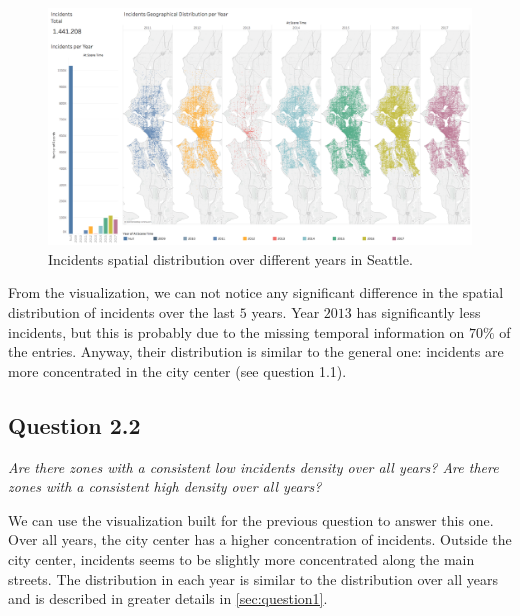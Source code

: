 \begin{figure}[h]
	\centering
	\includegraphics[width=\columnwidth]{figures/2_1_geographical_temporal_distribution}
	\caption{Incidents spatial distribution over different years in Seattle.}
	\label{fig:2_1_geographical_temporal_distribution}
\end{figure}

From the visualization, we can not notice any significant difference in the spatial distribution of incidents over the last $5$ years.
Year $2013$ has significantly less incidents, but this is probably due to the missing temporal information on $70\%$ of the entries.
Anyway, their distribution is similar to the general one: incidents are more concentrated in the city center (see question 1.1).


\subsection*{Question 2.2}
\textit{Are there zones with a consistent low incidents density over all years? Are there zones with a consistent high density over all years?}

We can use the visualization built for the previous question to answer this one.
Over all years, the city center has a higher concentration of incidents.
Outside the city center, incidents seems to be slightly more concentrated along the main streets.
The distribution in each year is similar to the distribution over all years and is described in greater details in \cref{sec:question1}.
